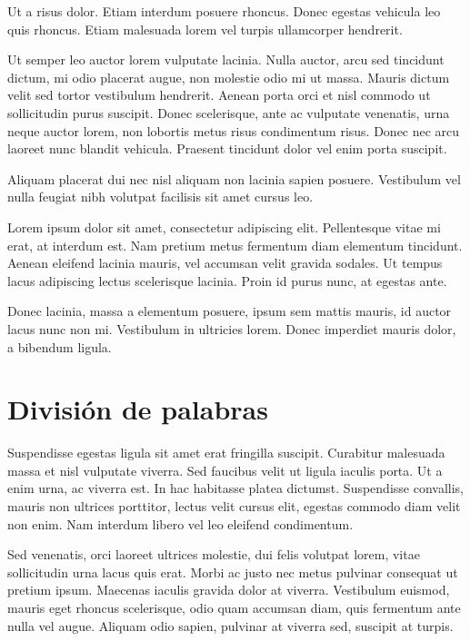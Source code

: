 \documentclass[12pt,a4paper]{report}
\begin{document}
Ut a risus dolor. Etiam interdum posuere rhoncus. Donec egestas vehicula leo quis rhoncus. Etiam malesuada lorem vel turpis ullamcorper hendrerit.

Ut semper leo auctor lorem vulputate lacinia. Nulla auctor, arcu sed tincidunt dictum, mi odio placerat augue, non molestie odio mi ut massa. Mauris dictum velit sed tortor vestibulum hendrerit. Aenean porta orci et nisl commodo ut sollicitudin purus suscipit. Donec scelerisque, ante ac vulputate venenatis, urna neque auctor lorem, non lobortis metus risus condimentum risus. Donec nec arcu laoreet nunc blandit vehicula. Praesent tincidunt dolor vel enim porta suscipit. 

Aliquam placerat dui nec nisl aliquam non lacinia sapien posuere. Vestibulum vel nulla feugiat nibh volutpat facilisis sit amet cursus leo.

Lorem ipsum dolor sit amet, consectetur adipiscing elit. Pellentesque vitae mi erat, at interdum est. Nam pretium metus fermentum diam elementum tincidunt. Aenean eleifend lacinia mauris, vel accumsan velit gravida sodales. Ut tempus lacus adipiscing lectus scelerisque lacinia. Proin id purus nunc, at egestas ante. 

Donec lacinia, massa a elementum posuere, ipsum sem mattis mauris, id auctor lacus nunc non mi. Vestibulum in ultricies lorem. Donec imperdiet mauris dolor, a bibendum ligula.



\section{División de palabras}
\label{seccion.division}



Suspendisse egestas ligula sit amet erat fringilla suscipit. Curabitur malesuada massa et nisl vulputate viverra. Sed faucibus velit ut ligula iaculis porta. Ut a enim urna, ac viverra est. In hac habitasse platea dictumst. Suspendisse convallis, mauris non ultrices porttitor, lectus velit cursus elit, egestas commodo diam velit non enim. Nam interdum libero vel leo eleifend condimentum. 

Sed venenatis, orci laoreet ultrices molestie, dui felis volutpat lorem, vitae sollicitudin urna lacus quis erat. Morbi ac justo nec metus pulvinar consequat ut pretium ipsum. Maecenas iaculis gravida dolor at viverra. Vestibulum euismod, mauris eget rhoncus scelerisque, odio quam accumsan diam, quis fermentum ante nulla vel augue. Aliquam odio sapien, pulvinar at viverra sed, suscipit at turpis. 
\end{document}
